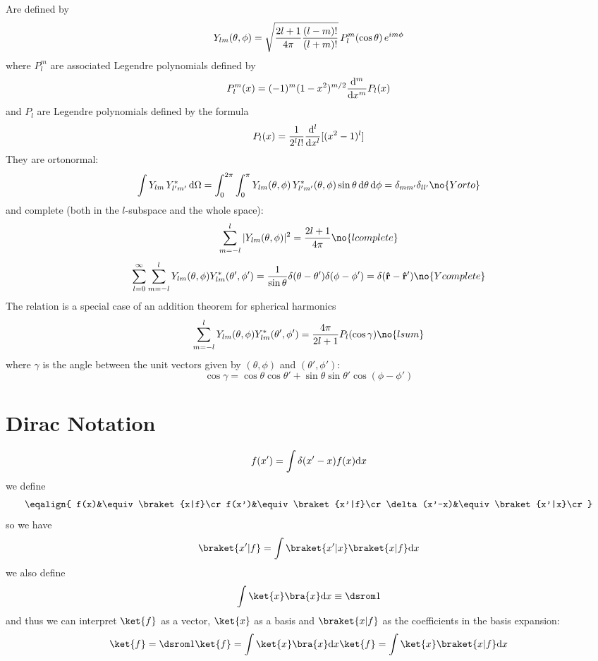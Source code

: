 Are defined by
$$Y_{lm}(\theta,\phi)=\sqrt{{2l+1\over4\pi}{(l-m)!\over(l+m)!}}\,P_l^m(\cos\theta)\,e^{im\phi}$$
where $P_l^m$ are associated Legendre polynomials defined by
$$P_l^m(x)=(-1)^m (1-x^2)^{m/2}{{\rm d}^m\over{\rm d} x^m} P_l(x)$$
and $P_l$ are Legendre polynomials defined by the formula
$$P_l(x)={1\over2^l l!}{{\rm d}^l\over{\rm d} x^l}[(x^2-1)^l]$$
They are ortonormal:
$$\int Y_{lm}\,Y^*_{l'm'}\,\d\Omega = 
\int_0^{2\pi}\int_0^{\pi}
Y_{lm}(\theta,\phi)\,Y^*_{l'm'}(\theta,\phi)\sin\theta\,\d\theta\,\d\phi = 
\delta_{mm'}\delta_{ll'}\no{Yorto}$$
and complete (both in the $l$-subspace and the whole space):
$$\sum_{m=-l}^l|Y_{lm}(\theta,\phi)|^2={2l+1\over4\pi}\no{lcomplete}$$
$$\sum_{l=0}^\infty\sum_{m=-l}^lY_{lm}(\theta,\phi)Y_{lm}^*(\theta',\phi')
={1\over\sin\theta}\delta(\theta-\theta')\delta(\phi-\phi')=
\delta({\bf\hat r}-{\bf\hat r'})\no{Ycomplete}$$
The relation  is a special case of an addition theorem for
spherical harmonics
$$\sum_{m=-l}^lY_{lm}(\theta,\phi)Y_{lm}^*(\theta',\phi')=
{4\pi\over 2l+1}P_l(\cos\gamma) \no{lsum}
$$
where $\gamma$ is the angle between the unit vectors given by $(\theta,\phi)$
and $(\theta',\phi')$:
$$\cos\gamma=\cos\theta\cos\theta'+\sin\theta\sin\theta'\cos(\phi-\phi')$$

\section{Dirac Notation}

$$f(x')=\int\delta(x'-x)f(x){\rm d} x$$
we define
$$\eqalign{
f(x)&\equiv\braket{x|f}\cr
f(x')&\equiv\braket{x'|f}\cr
\delta(x'-x)&\equiv\braket{x'|x}\cr
}$$
so we have
$$\braket{x'|f}=\int\braket{x'|x}\braket{x|f}\d x$$
we also define
$$\int\ket{x}\bra{x}\d x\equiv\one$$
and thus we can interpret $\ket{f}$ as a vector, $\ket{x}$ as a basis and
$\braket{x|f}$ as the coefficients in the basis expansion:
$$\ket{f}=\one\ket{f}=\int\ket{x}\bra{x}\d x\ket{f}=
\int\ket{x}\braket{x|f}\d x$$

